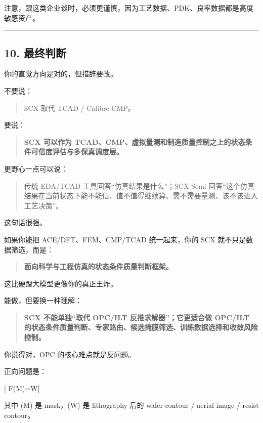 \documentclass[
  12pt,
]{ctexart}
\begin{document}
注意，跟这类企业谈时，必须更谨慎，因为工艺数据、PDK、良率数据都是高度敏感资产。

\begin{center}\rule{0.5\linewidth}{0.5pt}\end{center}

\subsection{10. 最终判断}\label{ux6700ux7ec8ux5224ux65ad-8}

你的直觉方向是对的，但措辞要改。

不要说：

\begin{quote}
SCX 取代 TCAD / Calibre CMP。
\end{quote}

要说：

\begin{quote}
\textbf{SCX 可以作为
TCAD、CMP、虚拟量测和制造质量控制之上的状态条件可信度评估与多保真调度层。}
\end{quote}

更野心一点可以说：

\begin{quote}
传统 EDA/TCAD 工具回答``仿真结果是什么''；SCX-Semi
回答``这个仿真结果在当前状态下能不能信、值不值得继续算、需不需要量测、该不该进入工艺决策''。
\end{quote}

这句话很强。

如果你能把 ACE/DFT、FEM、CMP/TCAD 统一起来，你的 SCX
就不只是数据筛选，而是：

\begin{quote}
\textbf{面向科学与工程仿真的状态条件质量判断框架。}
\end{quote}

这比硬蹭大模型更像你的真正王炸。

能做，但要换一种理解：

\begin{quote}
\textbf{SCX 不能单独``取代 OPC/ILT 反推求解器''；它更适合做 OPC/ILT
的状态条件质量判断、专家路由、候选掩膜筛选、训练数据选择和收敛风险控制。}
\end{quote}

你说得对，OPC 的核心难点就是反问题。

正向问题是：

{[} F(M)=W{]}

其中 (M) 是 mask，(W) 是 lithography 后的 wafer contour / aerial image /
resist contour。
\end{document}
